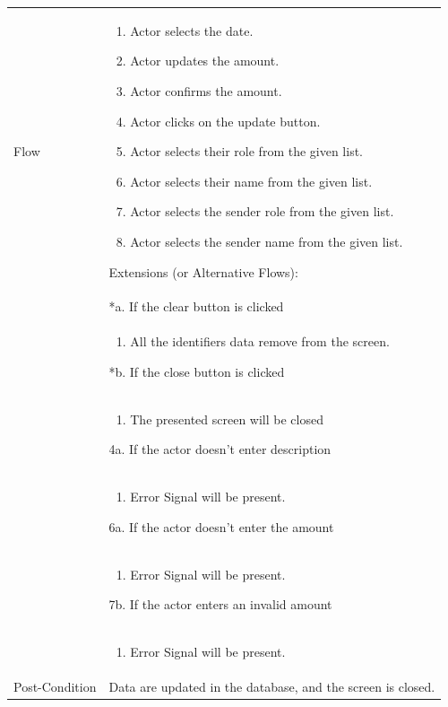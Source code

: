 \documentclass[12pt,a4paper]{report}
\begin{document}
\begin{tabular}{ | m{3cm} | m{12cm}| } \hline
Flow &
\begin{enumerate}

\item Actor selects the date. 
\item Actor updates the amount.
\item Actor confirms the amount.
\item Actor clicks on the update button.
\item Actor selects their role from the given list.
\item Actor selects their name from the given list.
\item Actor selects the sender role from the given list.
\item Actor selects the sender name from the given list.
\end{enumerate}
Extensions (or Alternative Flows):\\
& *a. If the clear button is clicked \\
& \begin{enumerate}
		\item All the identifiers data remove from the screen.
	\end{enumerate}
*b. If the close button is clicked\\
&	\begin{enumerate}
		\item The presented screen will be closed
	\end{enumerate}
4a. If the actor doesn't enter description \\ 	
&	\begin{enumerate}
		\item Error Signal will be present.
	\end{enumerate}
6a. If the actor doesn't enter the amount\\ 	
&	\begin{enumerate}
		\item Error Signal will be present.
	\end{enumerate}
7b. If the actor enters an invalid amount\\ 	
&	\begin{enumerate}
		\item Error Signal will be present.
	\end{enumerate}
\\ \hline
Post-Condition & Data are updated in the database, and the screen is closed.  \\\hline
\end{tabular}
\end{document}

